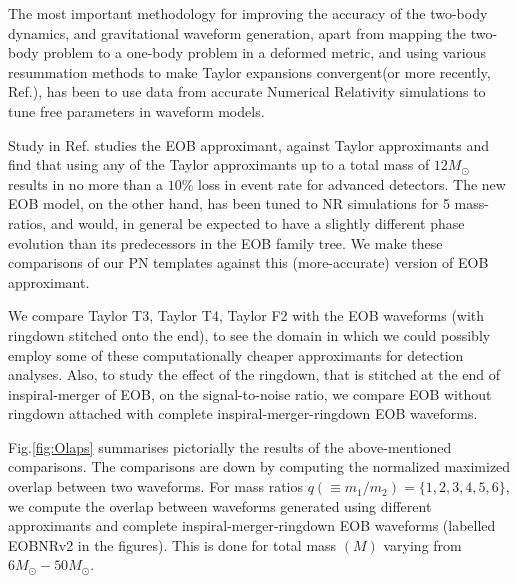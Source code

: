 \documentclass[aps,
prd,
amsmath,
amssymb,
twocolumn,
floatfix,
groupedaddress]{revtex4-1}
\begin{document}
The most important methodology for improving the accuracy of the two-body dynamics, and gravitational waveform generation, apart from mapping the two-body problem to a one-body problem in a deformed metric, and using various resummation methods to make Taylor expansions convergent\citep{PadeAD,ChebyshevResum2006}(or more recently, Ref.\citep{PadeSubDiag2011}), has been to use data from accurate Numerical Relativity simulations to tune free parameters in waveform models\citep{EOBNR01,EOBNRdevel01,EOBNRdevel02,EOBNRdevel03}.

Study in Ref.\cite{CompTemplates2009} studies the EOB approximant, against Taylor approximants and find that using any of the Taylor approximants up to a total mass of $12M_{\odot}$ results in no more than a $10\%$ loss in event rate for advanced detectors. The new EOB model\citep{BuonannoEOBv2Main}, on the other hand, has been tuned to NR simulations for 5 mass-ratios, and would, in general be expected to have a slightly different phase evolution than its predecessors in the EOB family tree. We make these comparisons of our PN templates against this (more-accurate) version of EOB approximant\citep{BuonannoEOBv2Main}.

We compare Taylor T3, Taylor T4, Taylor F2 with the EOB waveforms (with ringdown stitched onto the end), to see the domain in which we could possibly employ some of these computationally cheaper approximants for detection analyses. Also, to study the effect of the ringdown, that is stitched at the end of inspiral-merger of EOB, on the signal-to-noise ratio, we compare EOB without ringdown attached with complete inspiral-merger-ringdown EOB waveforms.

Fig.\ref{fig:Olaps} summarises pictorially the results of the above-mentioned comparisons. The comparisons are down by computing the normalized maximized overlap between two waveforms. For mass ratios $q(\equiv m_1/m_2) = \{1,2,3,4,5,6\}$, we compute the overlap between waveforms generated using different approximants and complete inspiral-merger-ringdown EOB waveforms (labelled EOBNRv2 in the figures). This is done for total mass $(M)$ varying from $6M_{\odot}-50M_{\odot}$.
\end{document}
